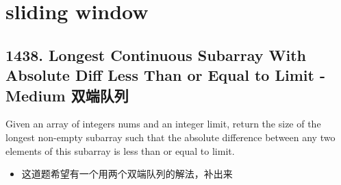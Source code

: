 \documentclass[9pt, b5paaper]{book}
\begin{document}
\chapter{sliding window}
\label{sec-12}
\section{1438. Longest Continuous Subarray With Absolute Diff Less Than or Equal to Limit - Medium 双端队列}
\label{sec-12-1}
Given an array of integers nums and an integer limit, return the size of the longest non-empty subarray such that the absolute difference between any two elements of this subarray is less than or equal to limit.

\begin{itemize}
\item 这道题希望有一个用两个双端队列的解法，补出来
\end{itemize}
\end{document}
